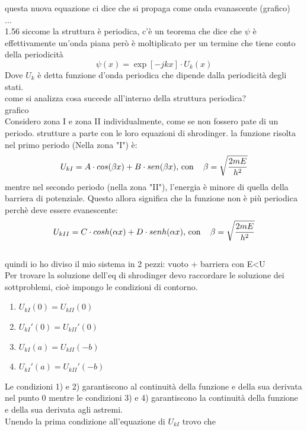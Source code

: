 questa nuova equazione ci dice che si propaga come onda evanascente (grafico)\\
...\\
1.56
siccome la struttura è periodica, c'è un teorema che dice che $\psi$ è effettivamente un'onda piana però è moltiplicato per un termine che tiene conto della periodicità
\begin{equation}
    \psi(x)=\exp{[-jkx]} \cdot U_k(x)
\end{equation}
Dove $U_k$ è detta funzione d'onda periodica che dipende dalla periodicità degli stati.\\
come si analizza cosa succede all'interno della struttura periodica?\\
grafico\\
Considero zona I e zona II individualmente, come se non fossero pate di un periodo. strutture a parte con le loro equazioni di shrodinger.
la funzione risolta nel primo periodo (Nella zona "I") è:
\begin{equation}
    U_{kI}=A \cdot cos(\beta x) + B \cdot sen(\beta x) \text{, con \,\,\, } \beta=\sqrt{\dfrac{2mE}{h^2}}
\end{equation}
mentre nel secondo periodo (nella zona "II"), l'energia è minore di quella della barriera di potenziale.
Questo allora significa che la funzione non è più periodica perchè deve essere evanescente:
\begin{equation}
    U_{kII}=C \cdot cosh(\alpha x) + D \cdot senh(\alpha x) \text{, con \,\,\, } \beta=\sqrt{\dfrac{2mE}{h^2}}
\end{equation}
%
\\
quindi io ho diviso il mio sistema in 2 pezzi:
 vuoto + barriera con E<U\\
Per trovare la soluzione dell'eq di shrodinger devo raccordare le soluzione dei sottproblemi, cioè impongo le condizioni di contorno.
\begin{enumerate}
    \item $U_{kI}(0) = U_{kII}(0)$
    \item $U_{kI}'(0) = U_{kII}'(0)$
    \item $U_{kI}(a) = U_{kII}(-b)$
    \item $U_{kI}'(a) = U_{kII}'(-b)$
\end{enumerate}
Le condizioni 1) e 2) garantiscono al continuità della funzione e della sua derivata nel punto 0 mentre le condizioni 3) e 4) garantiscono la continuità della funzione e della sua derivata agli astremi.\\
Unendo la prima condizione all'equazione di $U_{kI}$ trovo che
